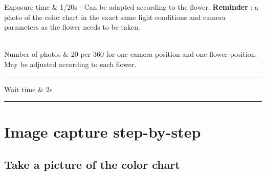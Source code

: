 \documentclass[
]{book}
\begin{document}
Exposure time \& 1/20s - Can be adapted according to the flower.
\textbf{Reminder} : a photo of the color chart in the exact same light
conditions and camera parameters as the flower needs to be taken.\\
\strut \\
Number of photos \& 20 per 360 for one camera position and one flower
position. May be adjusted according to each flower.\\

\begin{center}\rule{0.5\linewidth}{0.5pt}\end{center}

Wait time \& 2s\\

\begin{center}\rule{0.5\linewidth}{0.5pt}\end{center}

\hypertarget{image-capture-step-by-step}{%
\chapter{Image capture step-by-step}\label{image-capture-step-by-step}}

\hypertarget{take-a-picture-of-the-color-chart}{%
\section{Take a picture of the color chart}\label{take-a-picture-of-the-color-chart}}
\end{document}

